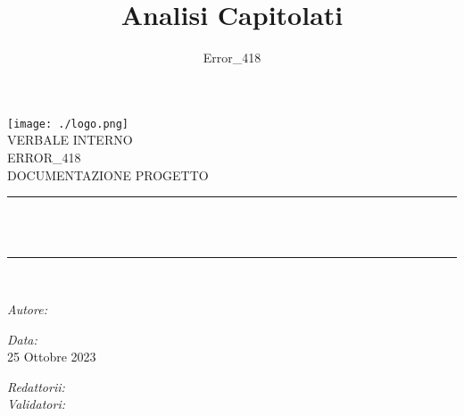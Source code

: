 \documentclass[a4paper, twoside]{article}
\title{\Huge Analisi Capitolati}
\author{Error\_418}
\newcommand{\HRule}{\rule{\linewidth}{0.5mm}}
\begin{document}
\sffamily
\begin{titlepage}
\centering
\texttt{[image: ./logo.png]}\\[1.5cm]
\center %
\textsf{\Huge VERBALE INTERNO}\\[2cm]
\textsf{\Large ERROR\_418}\\[0.5cm]
\textsf{\Large DOCUMENTAZIONE PROGETTO}\\[0.5cm]
\makeatletter
\HRule \\[0.4cm]
{ \huge \bfseries \@title}\\[0.4cm]
\HRule \\[1.5cm]
\begin{minipage}{0.4\textwidth}
\begin{flushleft} \large
\emph{Autore:}\\
\@author %
\end{flushleft}
\end{minipage}
\begin{minipage}{0.4\textwidth}
\begin{flushright} \large
\emph{Data:}\\
{\large 25 Ottobre 2023}\\[1cm]
\end{flushright}
\end{minipage}

\vspace{1cm} %

\begin{center} %
\emph{\Large Redattorii:}\\
\vspace{1cm} %
\emph{\Large Validatori:}\\
\end{center}

\vfill %
\end{titlepage}

\newpage %
\tableofcontents
\newpage

\end{document}
